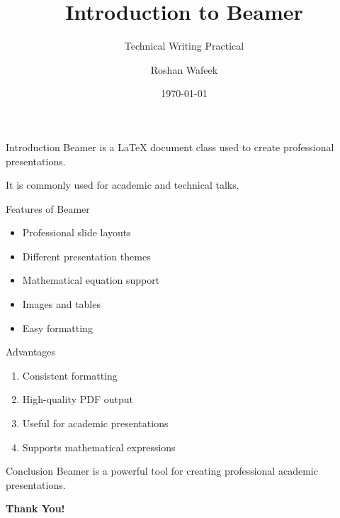 \documentclass{beamer}
\title{Introduction to Beamer}
\subtitle{Technical Writing Practical}
\author{Roshan Wafeek}
\institute{Technical Writing}
\date{\today}
\begin{document}
\begin{frame}
\titlepage
\end{frame}

\begin{frame}{Introduction}
Beamer is a LaTeX document class used to create
professional presentations.

It is commonly used for academic and technical talks.
\end{frame}

\begin{frame}{Features of Beamer}
\begin{itemize}
    \item Professional slide layouts
    \item Different presentation themes
    \item Mathematical equation support
    \item Images and tables
    \item Easy formatting
\end{itemize}
\end{frame}

\begin{frame}{Advantages}
\begin{enumerate}
    \item Consistent formatting
    \item High-quality PDF output
    \item Useful for academic presentations
    \item Supports mathematical expressions
\end{enumerate}
\end{frame}

\begin{frame}{Conclusion}
Beamer is a powerful tool for creating
professional academic presentations.

\centering
\textbf{Thank You!}
\end{frame}
\end{document}
